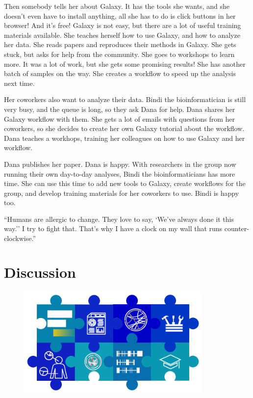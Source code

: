 \begin{center}
{Then somebody tells her about Galaxy.
It has the tools she wants, and she doesn't even have to install anything, all she has to do is click buttons in her browser!
And it's free!
Galaxy is not easy, but there are a lot of useful training materials available.
She teaches herself how to use Galaxy, and how to analyze her data. She reads papers and reproduces their methods in Galaxy.
She gets stuck, but asks for help from the community.
She goes to workshops to learn more.
It was a lot of work, but she gets some promising results! She has another batch of samples on the way. She creates a workflow to speed up the analysis next time.

Her coworkers also want to analyze their data.
Bindi the bioinformatician is still very busy, and the queue is long, so they ask Dana for help.
Dana shares her Galaxy workflow with them.
She gets a lot of emails with questions from her coworkers, so she decides to create her own Galaxy tutorial about the workflow.
Dana teaches a workhops, training her colleagues on how to use Galaxy and her workflow.

Dana publishes her paper. Dana is happy.
With researchers in the group now running their own day-to-day analyses, Bindi the bioinformaticians has more time.
She can use this time to add new tools to Galaxy, create workflows for the group, and develop training materials for her coworkers to use. Bindi is happy too.
\normalsize
}
\end{center}

\cleartorightpage

\begin{savequote}[75mm]
``Humans are allergic to change. They love to say, `We've always done it this way.'' I try to fight that. That's why I have a clock on my wall that runs counter-clockwise.''
\end{savequote}

\chapter{Discussion}\label{discussion}
\setcounter{figure}{-1}
\setcounter{table}{-1}
\setcounter{section}{-1}
\setcounter{NAT@ctr}{-1}

\begin{figure}[t!]
\includegraphics[height=15em]{frontmatter/images/chapter-header-discussion-tools.png}
\end{figure}
\setcounter{figure}{-1}
\setcounter{table}{-1}
\setcounter{section}{-1}


